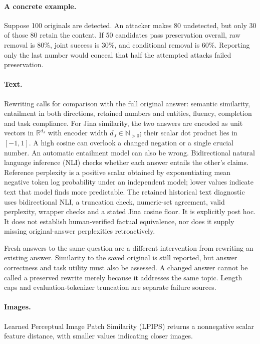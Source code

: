 \paragraph{A concrete example.} Suppose 100 originals are detected. An attacker makes 80 undetected, but only 30 of those 80 retain the content. If 50 candidates pass preservation overall, raw removal is $80\%$, joint success is $30\%$, and conditional removal is $60\%$. Reporting only the last number would conceal that half the attempted attacks failed preservation.

\paragraph{Text.} Rewriting calls for comparison with the full original answer: semantic similarity, entailment in both directions, retained numbers and entities, fluency, completion and task compliance. For Jina similarity, the two answers are encoded as unit vectors in $\mathbb R^{d_J}$ with encoder width $d_J\in\mathbb N_{>0}$; their scalar dot product lies in $[-1,1]$. A high cosine can overlook a changed negation or a single crucial number. An automatic entailment model can also be wrong. Bidirectional natural language inference (NLI) checks whether each answer entails the other's claims. Reference perplexity is a positive scalar obtained by exponentiating mean negative token log probability under an independent model; lower values indicate text that model finds more predictable. The retained historical text diagnostic uses bidirectional NLI, a truncation check, numeric-set agreement, valid perplexity, wrapper checks and a stated Jina cosine floor. It is explicitly post hoc. It does not establish human-verified factual equivalence, nor does it supply missing original-answer perplexities retroactively.

Fresh answers to the same question are a different intervention from rewriting an existing answer. Similarity to the saved original is still reported, but answer correctness and task utility must also be assessed. A changed answer cannot be called a preserved rewrite merely because it addresses the same topic. Length caps and evaluation-tokenizer truncation are separate failure sources.

\paragraph{Images.} Learned Perceptual Image Patch Similarity (LPIPS) returns a nonnegative scalar feature distance, with smaller values indicating closer images.

